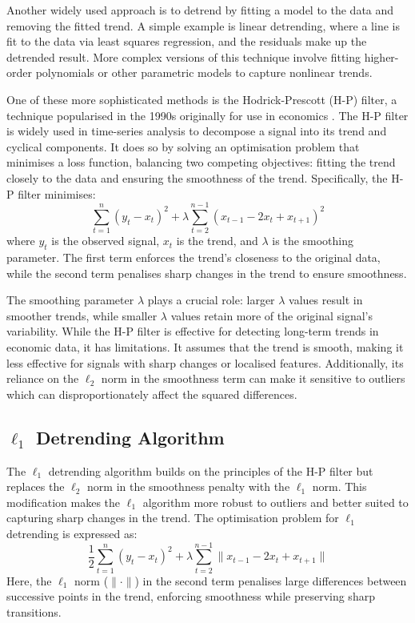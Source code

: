 Another widely used approach is to detrend by fitting a model to the data and removing the fitted trend. A simple example is linear detrending, where a line is fit to the data via least squares regression, and the residuals make up the detrended result. More complex versions of this technique involve fitting higher-order polynomials or other parametric models to capture nonlinear trends.

One of these more sophisticated methods is the Hodrick-Prescott (H-P) filter, a technique popularised in the 1990s originally for use in economics \cite{hodrick_postwar_1997, whittaker_new_1922}. The H-P filter is widely used in time-series analysis to decompose a signal into its trend and cyclical components. It does so by solving an optimisation problem that minimises a loss function, balancing two competing objectives: fitting the trend closely to the data and ensuring the smoothness of the trend. Specifically, the H-P filter minimises:
\begin{equation}
    \sum_{t=1}^n (y_t - x_t)^2 + \lambda \sum_{t=2}^{n-1} (x_{t-1} - 2x_t + x_{t+1})^2
\end{equation}
where $y_t$ is the observed signal, $x_t$ is the trend, and $\lambda$ is the smoothing parameter. The first term enforces the trend's closeness to the original data, while the second term penalises sharp changes in the trend to ensure smoothness.

The smoothing parameter $\lambda$ plays a crucial role: larger $\lambda$ values result in smoother trends, while smaller $\lambda$ values retain more of the original signal's variability. While the H-P filter is effective for detecting long-term trends in economic data, it has limitations. It assumes that the trend is smooth, making it less effective for signals with sharp changes or localised features. Additionally, its reliance on the $\ell_2$ norm in the smoothness term can make it sensitive to outliers which can disproportionately affect the squared differences.

\subsection{\texorpdfstring{$\ell_1$}{l1} Detrending Algorithm}
The $\ell_1$ detrending algorithm \cite{kim_ell_1_2009} builds on the principles of the H-P filter but replaces the $\ell_2$ norm in the smoothness penalty with the $\ell_1$ norm. This modification makes the $\ell_1$ algorithm more robust to outliers and better suited to capturing sharp changes in the trend. The optimisation problem for $\ell_1$ detrending is expressed as:
\begin{equation}
    \frac{1}{2} \sum_{t=1}^n (y_t - x_t)^2 + \lambda \sum_{t=2}^{n-1} \| x_{t-1} - 2x_t + x_{t+1} \|
\end{equation}
Here, the $\ell_1$ norm ($\| \cdot \|$) in the second term penalises large differences between successive points in the trend, enforcing smoothness while preserving sharp transitions.

